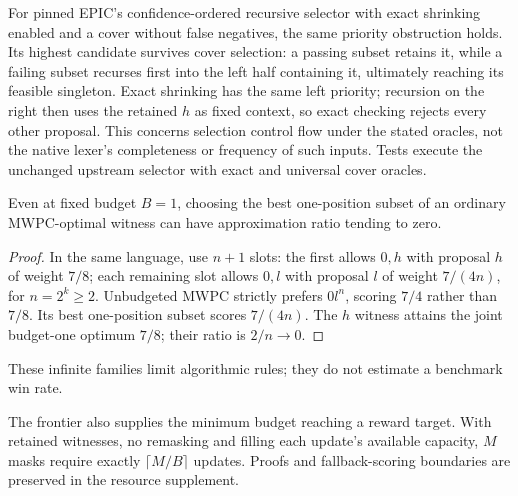 For pinned EPIC's confidence-ordered recursive selector with exact shrinking enabled and a cover without false negatives, the same priority obstruction holds. Its highest candidate survives cover selection: a passing subset retains it, while a failing subset recurses first into the left half containing it, ultimately reaching its feasible singleton. Exact shrinking has the same left priority; recursion on the right then uses the retained $h$ as fixed context, so exact checking rejects every other proposal. This concerns selection control flow under the stated oracles, not the native lexer's completeness or frequency of such inputs. Tests execute the unchanged upstream selector with exact and universal cover oracles.

\begin{theorem}
Even at fixed budget $B=1$, choosing the best one-position subset of an ordinary MWPC-optimal witness can have approximation ratio tending to zero.
\label{thm:budget-postfilter}
\end{theorem}
\begin{proof}
In the same language, use $n+1$ slots: the first allows $0,h$ with proposal $h$ of weight $7/8$; each remaining slot allows $0,l$ with proposal $l$ of weight $7/(4n)$, for $n=2^k\geq2$. Unbudgeted MWPC strictly prefers $0l^n$, scoring $7/4$ rather than $7/8$. Its best one-position subset scores $7/(4n)$. The $h$ witness attains the joint budget-one optimum $7/8$; their ratio is $2/n\to0$.
\end{proof}

These infinite families limit algorithmic rules; they do not estimate a benchmark win rate.



The frontier also supplies the minimum budget reaching a reward target.
With retained witnesses, no remasking and filling each update's available
capacity, $M$ masks require exactly $\lceil M/B\rceil$ updates. Proofs and
fallback-scoring boundaries are preserved in the resource supplement.
